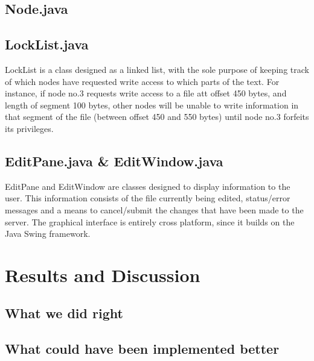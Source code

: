 \documentclass[12pt]{article}
\begin{document}
\subsection{Node.java} %
\label{sub:node_java}


\subsection{LockList.java} %
\label{sub:locklist_java}

LockList is a class designed as a linked list, with the sole purpose of keeping track of which nodes have requested write access to which parts of the text. For instance, if node no.3 requests write access to a file att offset 450 bytes, and length of segment 100 bytes, other nodes will be unable to write information in that segment of the file (between offset 450 and 550 bytes) until node no.3 forfeits its privileges.

\subsection{EditPane.java \& EditWindow.java} %
\label{sub:editpane}

EditPane and EditWindow are classes designed to display information to the user. This information consists of the file currently being edited, status/error messages and a means to cancel/submit the changes that have been made to the server. The graphical interface is entirely cross platform, since it builds on the Java Swing framework.


\section{Results and Discussion} %
\label{sec:results_and_discussion}

\subsection{What we did right} %
\label{sub:what_we_did_right}


\subsection{What could have been implemented better} %
\label{sub:what_could_have_been_implemented_better}
\end{document}
